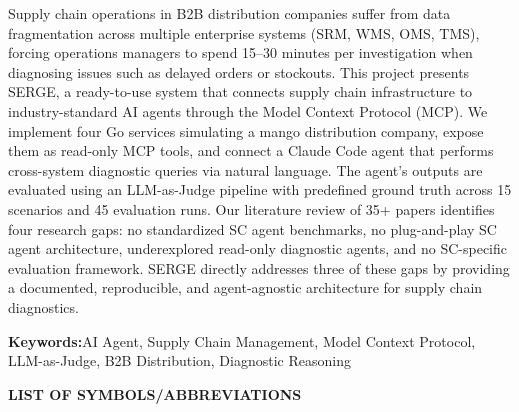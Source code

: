 \documentclass[12pt,a4paper]{report}
\begin{document}
\vspace{1em}

Supply chain operations in B2B distribution companies suffer from data fragmentation across multiple enterprise systems (SRM, WMS, OMS, TMS), forcing operations managers to spend 15--30 minutes per investigation when diagnosing issues such as delayed orders or stockouts. This project presents SERGE, a ready-to-use system that connects supply chain infrastructure to industry-standard AI agents through the Model Context Protocol (MCP). We implement four Go services simulating a mango distribution company, expose them as read-only MCP tools, and connect a Claude Code agent that performs cross-system diagnostic queries via natural language. The agent's outputs are evaluated using an LLM-as-Judge pipeline with predefined ground truth across 15 scenarios and 45 evaluation runs. Our literature review of 35+ papers identifies four research gaps: no standardized SC agent benchmarks, no plug-and-play SC agent architecture, underexplored read-only diagnostic agents, and no SC-specific evaluation framework. SERGE directly addresses three of these gaps by providing a documented, reproducible, and agent-agnostic architecture for supply chain diagnostics.

\vspace{1em}

\noindent\textbf{Keywords:}\quad AI Agent, Supply Chain Management, Model Context Protocol, LLM-as-Judge, B2B Distribution, Diagnostic Reasoning

\newpage
{}
\tableofcontents

\newpage
{}
\listoftables

\newpage
{}
\begin{center}
{\large\bfseries LIST OF SYMBOLS/ABBREVIATIONS}
\end{center}
\end{document}
